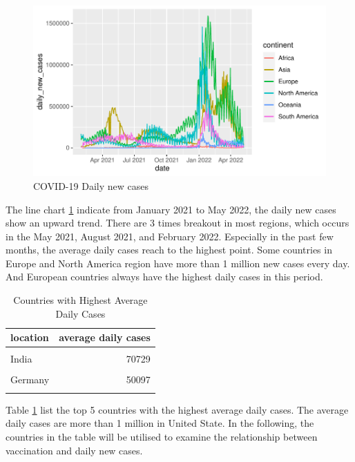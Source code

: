\documentclass[11pt,a4paper,]{article}
\begin{document}
\begin{figure}

{\centering \includegraphics{report_files/figure-latex/Figure1-1} 

}

\caption{COVID-19 Daily new cases}\label{fig:Figure1}
\end{figure}

The line chart \ref{fig:Figure1} indicate from January 2021 to May 2022, the daily new cases show an upward trend. There are 3 times breakout in most regions, which occurs in the May 2021, August 2021, and February 2022. Especially in the past few months, the average daily cases reach to the highest point. Some countries in Europe and North America region have more than 1 million new cases every day. And European countries always have the highest daily cases in this period.

\begin{table}[!h]

\caption{\label{tab:Table1}Countries with Highest Average Daily Cases}
\centering
\begin{tabular}[t]{l|r}
\hline
location & average daily cases\\
\hline
\cellcolor{gray!6}{United States} & \cellcolor{gray!6}{120485}\\
\hline
India & 70729\\
\hline
\cellcolor{gray!6}{France} & \cellcolor{gray!6}{56649}\\
\hline
Germany & 50097\\
\hline
\cellcolor{gray!6}{Brazil} & \cellcolor{gray!6}{46861}\\
\hline
\end{tabular}
\end{table}

Table \ref{tab:Table1} list the top 5 countries with the highest average daily cases. The average daily cases are more than 1 million in United State.
In the following, the countries in the table will be utilised to examine the relationship between vaccination and daily new cases.
\end{document}
